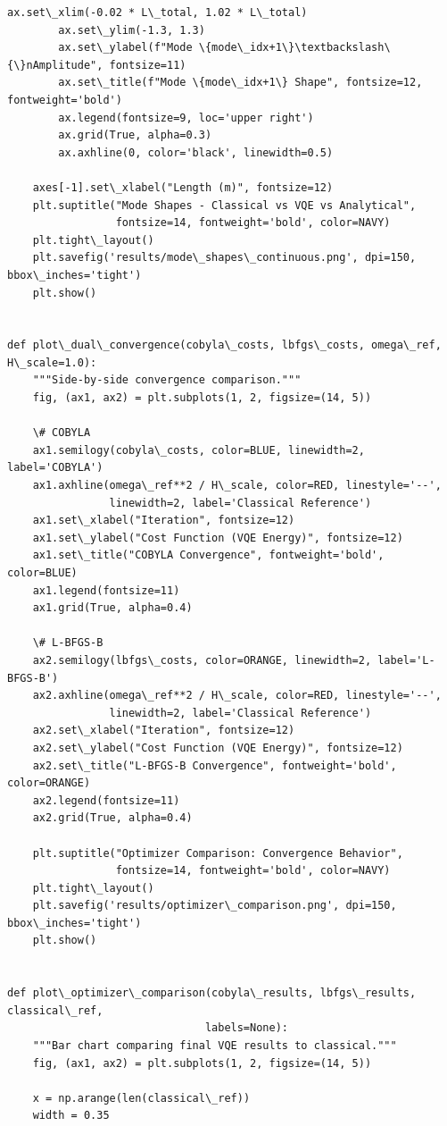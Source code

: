 \documentclass[12pt, a4paper]{article}
\begin{document}
\begin{lstlisting}[style=codestyle, caption={{visualize.py --- Beam and Truss Visualizations}}]
        ax.set\_xlim(-0.02 * L\_total, 1.02 * L\_total)
        ax.set\_ylim(-1.3, 1.3)
        ax.set\_ylabel(f"Mode \{mode\_idx+1\}\textbackslash\{\}nAmplitude", fontsize=11)
        ax.set\_title(f"Mode \{mode\_idx+1\} Shape", fontsize=12, fontweight='bold')
        ax.legend(fontsize=9, loc='upper right')
        ax.grid(True, alpha=0.3)
        ax.axhline(0, color='black', linewidth=0.5)

    axes[-1].set\_xlabel("Length (m)", fontsize=12)
    plt.suptitle("Mode Shapes - Classical vs VQE vs Analytical",
                 fontsize=14, fontweight='bold', color=NAVY)
    plt.tight\_layout()
    plt.savefig('results/mode\_shapes\_continuous.png', dpi=150, bbox\_inches='tight')
    plt.show()


def plot\_dual\_convergence(cobyla\_costs, lbfgs\_costs, omega\_ref, H\_scale=1.0):
    """Side-by-side convergence comparison."""
    fig, (ax1, ax2) = plt.subplots(1, 2, figsize=(14, 5))

    \# COBYLA
    ax1.semilogy(cobyla\_costs, color=BLUE, linewidth=2, label='COBYLA')
    ax1.axhline(omega\_ref**2 / H\_scale, color=RED, linestyle='--',
                linewidth=2, label='Classical Reference')
    ax1.set\_xlabel("Iteration", fontsize=12)
    ax1.set\_ylabel("Cost Function (VQE Energy)", fontsize=12)
    ax1.set\_title("COBYLA Convergence", fontweight='bold', color=BLUE)
    ax1.legend(fontsize=11)
    ax1.grid(True, alpha=0.4)

    \# L-BFGS-B
    ax2.semilogy(lbfgs\_costs, color=ORANGE, linewidth=2, label='L-BFGS-B')
    ax2.axhline(omega\_ref**2 / H\_scale, color=RED, linestyle='--',
                linewidth=2, label='Classical Reference')
    ax2.set\_xlabel("Iteration", fontsize=12)
    ax2.set\_ylabel("Cost Function (VQE Energy)", fontsize=12)
    ax2.set\_title("L-BFGS-B Convergence", fontweight='bold', color=ORANGE)
    ax2.legend(fontsize=11)
    ax2.grid(True, alpha=0.4)

    plt.suptitle("Optimizer Comparison: Convergence Behavior",
                 fontsize=14, fontweight='bold', color=NAVY)
    plt.tight\_layout()
    plt.savefig('results/optimizer\_comparison.png', dpi=150, bbox\_inches='tight')
    plt.show()


def plot\_optimizer\_comparison(cobyla\_results, lbfgs\_results, classical\_ref,
                               labels=None):
    """Bar chart comparing final VQE results to classical."""
    fig, (ax1, ax2) = plt.subplots(1, 2, figsize=(14, 5))

    x = np.arange(len(classical\_ref))
    width = 0.35


\end{lstlisting}
\end{document}
